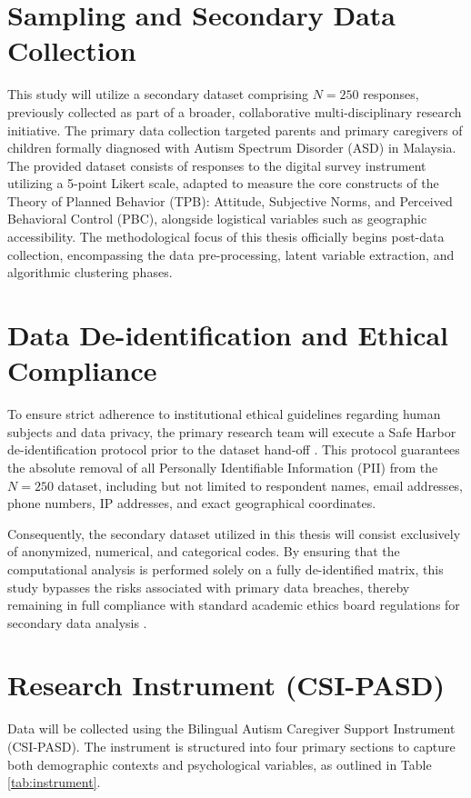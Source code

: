 \section{Sampling and Secondary Data Collection}
This study will utilize a secondary dataset comprising $N=250$ responses, previously collected as part of a broader, collaborative multi-disciplinary research initiative. The primary data collection targeted parents and primary caregivers of children formally diagnosed with Autism Spectrum Disorder (ASD) in Malaysia. The provided dataset consists of responses to the digital survey instrument utilizing a 5-point Likert scale, adapted to measure the core constructs of the Theory of Planned Behavior (TPB): Attitude, Subjective Norms, and Perceived Behavioral Control (PBC), alongside logistical variables such as geographic accessibility. The methodological focus of this thesis officially begins post-data collection, encompassing the data pre-processing, latent variable extraction, and algorithmic clustering phases.

\section{Data De-identification and Ethical Compliance}
To ensure strict adherence to institutional ethical guidelines regarding human subjects and data privacy, the primary research team will execute a Safe Harbor de-identification protocol prior to the dataset hand-off \citep{Vayena2018_97, WorldHealthOrganization2021_86}. This protocol guarantees the absolute removal of all Personally Identifiable Information (PII) from the $N=250$ dataset, including but not limited to respondent names, email addresses, phone numbers, IP addresses, and exact geographical coordinates. 

Consequently, the secondary dataset utilized in this thesis will consist exclusively of anonymized, numerical, and categorical codes. By ensuring that the computational analysis is performed solely on a fully de-identified matrix, this study bypasses the risks associated with primary data breaches, thereby remaining in full compliance with standard academic ethics board regulations for secondary data analysis \citep{OrganisationforEconomicCooperationandDevelopment2022_81}.

\section{Research Instrument (CSI-PASD)}
Data will be collected using the Bilingual Autism Caregiver Support Instrument (CSI-PASD). The instrument is structured into four primary sections to capture both demographic contexts and psychological variables, as outlined in Table \ref{tab:instrument}.

